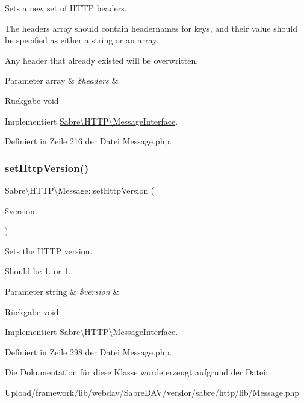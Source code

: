 Sets a new set of H\+T\+TP headers.

The headers array should contain headernames for keys, and their value should be specified as either a string or an array.

Any header that already existed will be overwritten.


\begin{DoxyParams}[1]{Parameter}
array & {\em \$headers} & \\
\hline
\end{DoxyParams}
\begin{DoxyReturn}{Rückgabe}
void 
\end{DoxyReturn}


Implementiert \mbox{\hyperlink{interface_sabre_1_1_h_t_t_p_1_1_message_interface_afd622b82029b37f47af76f83b17ba12f}{Sabre\textbackslash{}\+H\+T\+T\+P\textbackslash{}\+Message\+Interface}}.



Definiert in Zeile 216 der Datei Message.\+php.

\mbox{\label{class_sabre_1_1_h_t_t_p_1_1_message_a92fc3c197a8d7c713c7ccafc61989147}} 
\subsubsection{\texorpdfstring{set\+Http\+Version()}{setHttpVersion()}}
{\footnotesize\ttfamily Sabre\textbackslash{}\+H\+T\+T\+P\textbackslash{}\+Message\+::set\+Http\+Version (\begin{DoxyParamCaption}\item[{}]{\$version }\end{DoxyParamCaption})}

Sets the H\+T\+TP version.

Should be 1. or 1..


\begin{DoxyParams}[1]{Parameter}
string & {\em \$version} & \\
\hline
\end{DoxyParams}
\begin{DoxyReturn}{Rückgabe}
void 
\end{DoxyReturn}


Implementiert \mbox{\hyperlink{interface_sabre_1_1_h_t_t_p_1_1_message_interface_a3b078aad665c00c171bc2a9b7ac05d6d}{Sabre\textbackslash{}\+H\+T\+T\+P\textbackslash{}\+Message\+Interface}}.



Definiert in Zeile 298 der Datei Message.\+php.



Die Dokumentation für diese Klasse wurde erzeugt aufgrund der Datei\+:\begin{DoxyCompactItemize}
\item 
Upload/framework/lib/webdav/\+Sabre\+D\+A\+V/vendor/sabre/http/lib/Message.\+php\end{DoxyCompactItemize}
